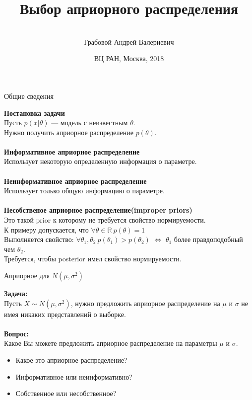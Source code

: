\documentclass[10pt]{beamer}
\title[\hbox to 56mm{Выбор априорного распределения  \hfill\insertframenumber\,/\,\inserttotalframenumber}]{Выбор априорного распределения}
\author[А.\,В. Грабовой]{\large \\Грабовой Андрей Валериевич}
\institute{\large
Московский физико-технический институт}
\date{\footnotesize{ВЦ РАН, Москва, 2018}}
\begin{document}
\begin{frame}
\titlepage
\end{frame}
\begin{frame}{Общие сведения}

{\bf Постановка задачи}\\
\quad
	Пусть $p(x|\theta)$ --- модель с неизвестным $\theta$.\\
\quad
	Нужно получить априорное распределение $p(\theta)$.\\
	~\\
{\bf Информативное априорное распределение}\\
\quad
	Использует некоторую определенную информация о параметре.\\
	~\\
	
{\bf Неинформативное априорное распределение}\\
\quad
	Использует только общую информацию о параметре.\\
	~\\
{\bf Несобственое априорное распределение(improper priors)}\\
\quad
	Это такой prior к которому не требуется свойство нормируемости.\\
\quad
	К примеру допускается, что $\forall \theta \in \mathbb{R}~p(\theta) = 1$\\ 
\quad
	Выполняется свойство: $\forall \theta_1, \theta_2~ p(\theta_1)>p(\theta_2) $ $\Leftrightarrow$ $ \theta_1$ более правдоподобный чем $\theta_2$.\\
\quad Требуется, чтобы posterior имел свойство нормируемости.
	~\\

\end{frame}
\begin{frame}{Априорное для $N(\mu, \sigma^2)$}

{\bf Задача:}\\
 \quad
 	Пусть $X\sim N(\mu, \sigma^2)$, нужно предложить априорное распределение на $\mu$ и $\sigma$ не имея никаких представлений о выборке.\\
 	~\\
{\bf Вопрос:}\\
 \quad
 	Какое Вы можете предложить априорное распределение на параметры $\mu$ и $\sigma$.\\
\begin{itemize}
	\item Какое это априорное распределение?
	\item Информативное или неинформативно?
	\item  Собственное или несобственное?
\end{itemize}
\end{frame}
\end{document}
